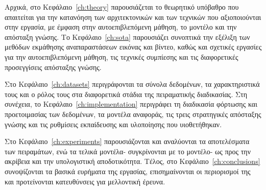Αρχικά, στο Κεφάλαιο~\ref{ch:theory} παρουσιάζεται το θεωρητικό
υπόβαθρο που απαιτείται για την κατανόηση των αρχιτεκτονικών και των
τεχνικών που αξιοποιούνται στην εργασία, με έμφαση στην
αυτοεπιβλεπόμενη μάθηση, το μοντέλο  και την απόσταξη
γνώσης. Το Κεφάλαιο~\ref{ch:sota} παρουσιάζει συνοπτικά την εξέλιξη των μεθόδων
εκμάθησης αναπαραστάσεων εικόνας και βίντεο, καθώς και σχετικές εργασίες
για την αυτοεπιβλεπόμενη μάθηση, τις τεχνικές συμπίεσης και τις
διαφορετικές προσεγγίσεις απόσταξης γνώσης.

Στο Κεφάλαιο~\ref{ch:datasets} περιγράφονται τα σύνολα δεδομένων, τα
χαρακτηριστικά τους και ο ρόλος τους στα διαφορετικά στάδια της
πειραματικής διαδικασίας. Στη συνέχεια, το
Κεφάλαιο~\ref{ch:implementation} περιγράφει τη διαδικασία φόρτωσης και
προετοιμασίας των δεδομένων, τα μοντέλα αναφοράς, τις τρεις στρατηγικές
απόσταξης γνώσης και τις ρυθμίσεις εκπαίδευσης και υλοποίησης που υιοθετήθηκαν.

Στο Κεφάλαιο~\ref{ch:experiments} παρουσιάζονται και αναλύονται τα
αποτελέσματα των πειραμάτων, ενώ τα τελικά μοντέλα-
συγκρίνονται με το μοντέλο- ως προς την ακρίβεια και την
υπολογιστική αποδοτικότητα. Τέλος, στο Κεφάλαιο~\ref{ch:conclusions}
συνοψίζονται τα βασικά ευρήματα της εργασίας, επισημαίνονται οι
περιορισμοί της και προτείνονται κατευθύνσεις για μελλοντική έρευνα.

